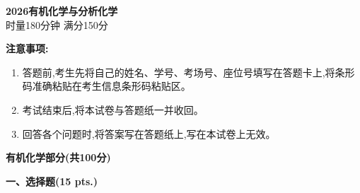 \begin{center}
    {\LARGE \textbf{2026有机化学与分析化学}} \\[2ex]
    {\large 时量180分钟 \quad 满分150分}
\end{center}

\vspace{0.5cm}
\noindent\textbf{注意事项:}
\begin{enumerate}[label=\arabic*., parsep=0pt, itemsep=0pt]
    \item 答题前,考生先将自己的姓名、学号、考场号、座位号填写在答题卡上,将条形码准确粘贴在考生信息条形码粘贴区。
    \item 考试结束后,将本试卷与答题纸一并收回。
    \item 回答各个问题时,将答案写在答题纸上,写在本试卷上无效。
\end{enumerate}

\vspace{1cm}
\begin{center}
    {\Large \textbf{有机化学部分(共100分)}}
\end{center}

\vspace{0.5cm}
\noindent\textbf{一、选择题(15 pts.)}

